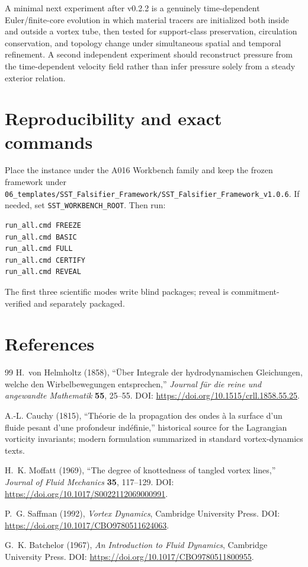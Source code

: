 \documentclass[11pt,a4paper]{article}
\begin{document}
A minimal next experiment after v0.2.2 is a genuinely time-dependent Euler/finite-core evolution in which material tracers are initialized both inside and outside a vortex tube, then tested for support-class preservation, circulation conservation, and topology change under simultaneous spatial and temporal refinement. A second independent experiment should reconstruct pressure from the time-dependent velocity field rather than infer pressure solely from a steady exterior relation.


\section{Reproducibility and exact commands}
Place the instance under the A016 Workbench family and keep the frozen framework under \texttt{06\_templates/SST\_Falsifier\_Framework/SST\_Falsifier\_Framework\_v1.0.6}. If needed, set \texttt{SST\_WORKBENCH\_ROOT}. Then run:
\begin{verbatim}
run_all.cmd FREEZE
run_all.cmd BASIC
run_all.cmd FULL
run_all.cmd CERTIFY
run_all.cmd REVEAL
\end{verbatim}
The first three scientific modes write blind packages; reveal is commitment-verified and separately packaged.

\section{References}
\begin{thebibliography}{99}
H.~von Helmholtz (1858), ``\"Uber Integrale der hydrodynamischen Gleichungen, welche den Wirbelbewegungen entsprechen,'' \emph{Journal f\"ur die reine und angewandte Mathematik} \textbf{55}, 25--55. DOI: \url{https://doi.org/10.1515/crll.1858.55.25}.

A.-L. Cauchy (1815), ``Th\'eorie de la propagation des ondes \`a la surface d'un fluide pesant d'une profondeur ind\'efinie,'' historical source for the Lagrangian vorticity invariants; modern formulation summarized in standard vortex-dynamics texts.

H.~K. Moffatt (1969), ``The degree of knottedness of tangled vortex lines,'' \emph{Journal of Fluid Mechanics} \textbf{35}, 117--129. DOI: \url{https://doi.org/10.1017/S0022112069000991}.

P.~G. Saffman (1992), \emph{Vortex Dynamics}, Cambridge University Press. DOI: \url{https://doi.org/10.1017/CBO9780511624063}.

G.~K. Batchelor (1967), \emph{An Introduction to Fluid Dynamics}, Cambridge University Press. DOI: \url{https://doi.org/10.1017/CBO9780511800955}.
\end{thebibliography}
\end{document}
